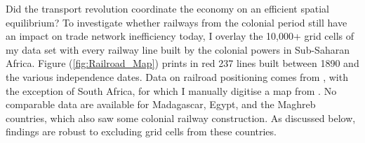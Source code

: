 \documentclass[11pt, oneside]{article}   	%
\let\oldref\ref
\renewcommand{\ref}[1]{(\oldref{#1})}
\begin{document}
Did the transport revolution coordinate the economy on an efficient spatial equilibrium? To investigate whether railways from the colonial period still have an impact on trade network inefficiency today, I overlay the 10,000+ grid cells of my data set with every railway line built by the colonial powers in Sub-Saharan Africa. Figure \ref{fig:Railroad_Map} prints in red 237 lines built between 1890 and the various independence dates. Data on railroad positioning comes from \cite{Jedwab_PermanentEffectsTransportation_2016a}, with the exception of South Africa, for which I manually digitise a map from \cite{Herranz-Loncan_publicbenefitRailways_2017}. No comparable data are available for Madagascar, Egypt, and the Maghreb countries, which also saw some colonial railway construction. As discussed below, findings are robust to excluding grid cells from these countries.
\end{document}
